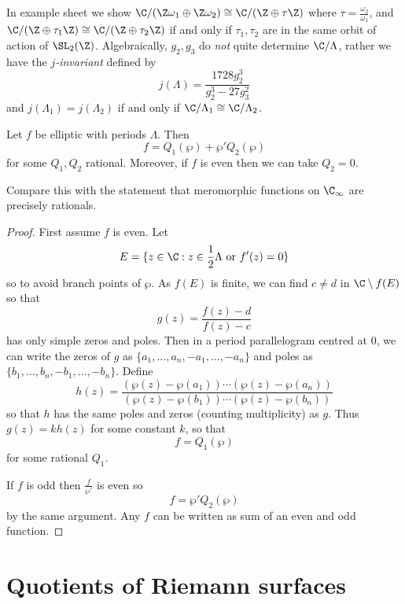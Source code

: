 \documentclass[a4paper]{article}
\begin{document}
\begin{remark}
  In example sheet we show \(\C/(\Z\omega_1 \oplus \Z\omega_2) \cong \C/(\Z \oplus \tau \Z)\) where \(\tau = \frac{\omega_2}{\omega_1}\), and \(\C/(\Z \oplus \tau_1\Z) \cong \C/(\Z \oplus \tau_2\Z)\) if and only if \(\tau_1, \tau_2\) are in the same orbit of action of \(\SL_2(\Z)\). Algebraically, \(g_2, g_3\) do \emph{not} quite determine \(\C/\Lambda\), rather we have the \emph{\(j\)-invariant} defined by
  \[
    j(\Lambda) = \frac{1728g_2^3}{g_2^3 - 27 g_3^2}
  \]
  and \(j(\Lambda_1) = j(\Lambda_2)\) if and only if \(\C/\Lambda_1 \cong \C/\Lambda_2\).
\end{remark}

\begin{theorem}
  Let \(f\) be elliptic with periods \(\Lambda\). Then
  \[
    f = Q_1(\wp) + \wp' Q_2(\wp)
  \]
  for some \(Q_1, Q_2\) rational. Moreover, if \(f\) is even then we can take \(Q_2 = 0\).
\end{theorem}

Compare this with the statement that meromorphic functions on \(\C_\infty\) are precisely rationals.

\begin{proof}
  First assume \(f\) is even. Let
  \[
    E = \{z \in \C: z \in \frac{1}{2} \Lambda \text{ or } f'(z) = 0\}
  \]
  so to avoid branch points of \(\wp\). As \(f(E)\) is finite, we can find \(c \neq d\) in \(\C \setminus f(E)\) so that
  \[
    g(z) = \frac{f(z) - d}{f(z) - c}
  \]
  has only simple zeros and poles. Then in a period parallelogram centred at \(0\), we can write the zeros of \(g\) as \(\{a_1, \dots, a_n, -a_1, \dots, -a_n\}\) and poles as \(\{b_1, \dots, b_n, -b_1, \dots, -b_n\}\). Define
  \[
    h(z) = \frac{(\wp(z) - \wp(a_1)) \cdots (\wp(z) - \wp(a_n))}{(\wp(z) - \wp(b_1)) \cdots (\wp(z) - \wp(b_n))}
  \]
  so that \(h\) has the same poles and zeros (counting multiplicity) as \(g\). Thus \(g(z) = kh(z)\) for some constant \(k\), so that
  \[
    f = Q_1(\wp)
  \]
  for some rational \(Q_1\).

  If \(f\) is odd then \(\frac{f}{\wp'}\) is even so
  \[
    f = \wp' Q_2(\wp)
  \]
  by the same argument. Any \(f\) can be written as sum of an even and odd function.
\end{proof}

\section{Quotients of Riemann surfaces}
\end{document}
